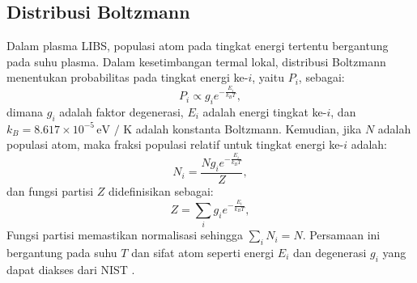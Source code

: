 \subsection{Distribusi Boltzmann}
Dalam plasma LIBS, populasi atom pada tingkat energi tertentu bergantung pada suhu plasma. Dalam kesetimbangan termal lokal, distribusi Boltzmann menentukan probabilitas pada tingkat energi ke-\( i \), yaitu \( P_i \), sebagai:
\begin{equation}
P_i \propto g_i e^{-\frac{E_i}{k_B T}}, \label{eq:bab2_eq4}
\end{equation}
dimana \( g_i \) adalah faktor degenerasi, \( E_i \) adalah energi tingkat ke-\( i \), dan \( k_B = 8.617 \times 10^{-5} \, \text{eV / K} \) adalah konstanta Boltzmann. Kemudian, jika \( N \) adalah populasi atom, maka fraksi populasi relatif untuk tingkat energi ke-\( i \) adalah:
\begin{equation}
N_i = \frac{N g_i e^{-\frac{E_i}{k_B T}}}{Z}, \label{eq:boltzmann1}
\end{equation}
dan fungsi partisi \( Z \) didefinisikan sebagai:
\begin{equation}
Z = \sum_i g_i e^{-\frac{E_i}{k_B T}}, \label{eq:bab2_eq5}
\end{equation}
Fungsi partisi memastikan normalisasi sehingga \( \sum_i N_i = N \). Persamaan ini bergantung pada suhu \( T \) dan sifat atom seperti energi \( E_i \) dan degenerasi \( g_i \) yang dapat diakses dari NIST \citep{Pathria2011,Rybicki1985}.

